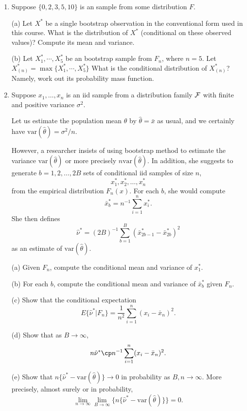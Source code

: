 \begin{enumerate}
(a) For the purpose of implementation, you need to work out
some additional details for these two tests such as the asymptotic
variances. Get them done and present your work and results.

(b) Suppose the precisions of the asymptotic distributions for these two
tests are not sufficiently high. Design bootstrap procedures to carry out
these two tests.

(c) Implement the bootstrap procedures in (b) based on $B=1999$ and repeat
$N=500$ to obtain observed rejection rate under the null hypothesis.

\item
Suppose $\{0, 2, 3, 5, 10\}$ is an \iid sample from some distribution $F$.

(a) Let $X^*$ be a single bootstrap observation in the conventional form
used in this course. What is the distribution of $X^*$ (conditional on 
these observed values)? Compute its mean and variance.

(b) Let $X_1^*, \cdots, X_5^*$ be an \iid bootstrap sample from $F_n$,
where $n=5$.
Let $X^*_{(n)} = \max \{X_1^*, \cdots, X_5^*\}$
What is the conditional distribution of $X^*_{(n)}$? Namely,
work out its probability mass function.


\item
Suppose $x_1, \ldots, x_n$ is an iid sample from a distribution
family ${\cal F}$ with finite and positive variance $\sigma^2$.

Let us estimate the population mean $\theta$ by $\hat \theta = \bar x$
as usual, and we certainly have $\mbox{var}(\hat \theta) = \sigma^2/n$.

However, a researcher insists of using bootstrap method to
estimate the variance $\mbox{var}(\hat \theta)$ or more precisely
$n\mbox{var}(\hat \theta)$. In addition, she suggests to generate 
$b=1, 2, \ldots, 2B$ sets of conditional iid samples of size $n$,
\[
x_1^*, x_2^*, \ldots, x_{n}^*
\]
from the empirical distribution $F_n(x)$. 
For each $b$, she would compute 
\[
\bar x_b^* = n^{-1} \sum_{i=1}^n x_i^*.
\]
She then defines
\[
\hat \nu^* = (2B)^{-1} \sum_{b=1}^B (\bar x_{2b-1}^*- \bar x^*_{2b})^2
\]
as an estimate of $\mbox{var}(\hat \theta)$.

(a)  Given $F_n$, compute the conditional mean and variance of $x_1^*$.

(b) For each $b$, compute the conditional mean and variance of
$\bar x_b^*$ given $F_n$.

(c)
Show that the conditional expectation 
\[
E\{ \hat \nu^*|F_n\} = \frac{1}{n^2} \sum_{i=1}^n ( x_i - \bar x_n)^2.
\]

(d) Show that as $B \to \infty$, 
\[
n \hat \nu^* \cp  n^{-1} \sum_{i=1}^n ( x_i - \bar x_n)^2.
\]

(e) Show that $n\{ \hat \nu^* - \mbox{var}(\hat \theta)\} \to 0$
in probability as $B, n \to \infty$. More precisely, almost surely or in probability,
\[
\lim_{n \to \infty} \lim_{B \to \infty} \{ n\{ \hat \nu^* - \mbox{var}(\hat \theta)\} \} = 0.
\]

\end{enumerate}


